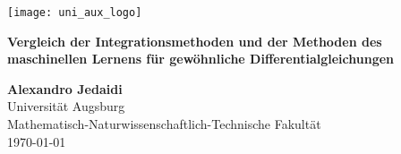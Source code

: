 \begin{titlepage}
    \begin{center}
        \vspace*{1cm}
        \texttt{[image: uni\_aux\_logo]}
        \vspace{2.5cm}

        \Large
        \textbf{Vergleich der Integrationsmethoden und der Methoden des maschinellen Lernens für gewöhnliche
        Differentialgleichungen}

        \vspace{1.5cm}
        \textbf{Alexandro Jedaidi}\\
        Universität Augsburg \\
        Mathematisch-Naturwissenschaftlich-Technische Fakultät\\
        \today
    \end{center}
\end{titlepage}